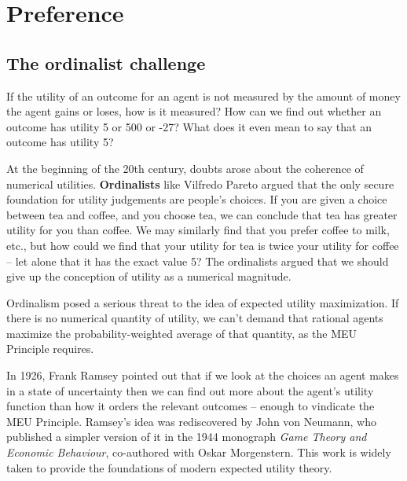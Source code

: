 \chapter{Preference}\label{ch:preference}

%

\section{The ordinalist challenge}

If the utility of an outcome for an agent is not measured by the amount of money
the agent gains or loses, how is it measured? How can we find out whether an
outcome has utility 5 or 500 or -27? What does it even mean to say that an
outcome has utility 5?

At the beginning of the 20th century, doubts arose about the coherence of
numerical utilities. \textbf{Ordinalists} like Vilfredo Pareto argued that the
only secure foundation for utility judgements are people's choices. If you are
given a choice between tea and coffee, and you choose tea, we can conclude that
tea has greater utility for you than coffee. We may similarly find that you
prefer coffee to milk, etc., but how could we find that your utility for tea is
twice your utility for coffee -- let alone that it has the exact value 5? The
ordinalists argued that we should give up the conception of utility as a
numerical magnitude.


Ordinalism posed a serious threat to the idea of expected utility maximization.
If there is no numerical quantity of utility, we can't demand that rational
agents maximize the probability-weighted average of that quantity, as the MEU
Principle requires.

In 1926, Frank Ramsey pointed out that if we look at the choices an agent makes
in a state of uncertainty then we can find out more about the agent's utility
function than how it orders the relevant outcomes -- enough to vindicate the MEU
Principle. Ramsey's idea was rediscovered by John von Neumann, who published a
simpler version of it in the 1944 monograph \emph{Game Theory and Economic
  Behaviour}, co-authored with Oskar Morgenstern. This work is widely taken to
provide the foundations of modern expected utility theory.


